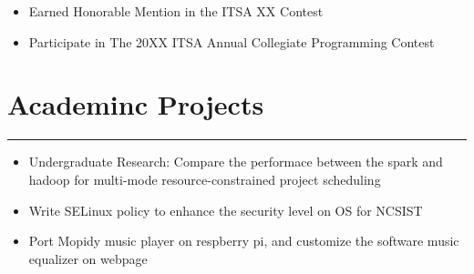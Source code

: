 \documentclass[12pt]{article}
\begin{document}
	\begin{itemize}
		\item Earned Honorable Mention in the ITSA XX Contest
		\item Participate in The 20XX ITSA Annual Collegiate Programming Contest
		
	\end{itemize}
		

	\section*{Academinc Projects}
	\nointerlineskip
	\noindent\rule{450pt}{0.4pt}
	\begin{itemize}
	\item Undergraduate Research: Compare the performace  between the spark and hadoop for multi-mode resource-constrained project scheduling
	\item Write SELinux policy to enhance the security level on OS for NCSIST
	\item Port Mopidy music player on respberry pi, and customize the software music equalizer on webpage
	\end{itemize}

	
\end{document}
